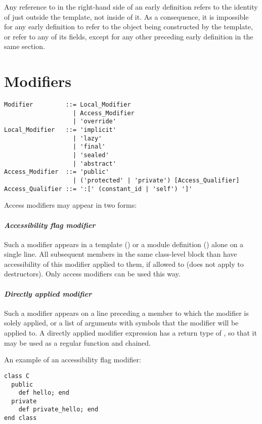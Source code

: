 Any reference to  in the right-hand side of an early definition refers to the identity of  just outside the template, not inside of it. As a consequence, it is impossible for any early definition to refer to the object being constructed by the template, or refer to any of its fields, except for any other preceding early definition in the same section. 







\section{Modifiers}
\label{sec:modifiers}

\syntax\begin{lstlisting}
Modifier         ::= Local_Modifier
                   | Access_Modifier
                   | 'override'
Local_Modifier   ::= 'implicit'
                   | 'lazy'
                   | 'final'
                   | 'sealed'
                   | 'abstract'
Access_Modifier  ::= 'public'
                   | ('protected' | 'private') [Access_Qualifier]
Access_Qualifier ::= ':[' (constant_id | 'self') ']'
\end{lstlisting}

Access modifiers may appear in two forms:

\paragraph{\em Accessibility flag modifier}
Such a modifier appears in a template () or a module definition () alone on a single line. All subsequent members in the same class-level block than have accessibility of this modifier applied to them, if allowed to (does not apply to destructors). Only access modifiers can be used this way. 

\paragraph{\em Directly applied modifier}
Such a modifier appears on a line preceding a member to which the modifier is solely applied, or a list of arguments with symbols that the modifier will be applied to. A directly applied modifier expression has a return type of , so that it may be used as a regular function and chained. 

\example An example of an accessibility flag modifier:
\begin{lstlisting}
class C
  public
    def hello; end
  private
    def private_hello; end
end class
\end{lstlisting}

